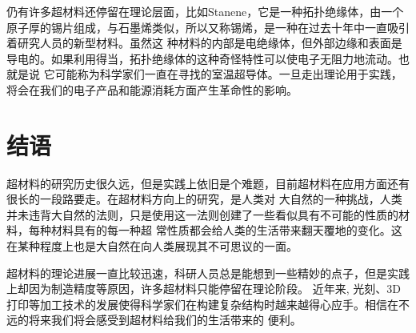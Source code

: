 \documentclass[UTF8]{ctexart}
\begin{document}
仍有许多超材料还停留在理论层面，比如Stanene，它是一种拓扑绝缘体，由一个原子厚的锡片组成，与石墨烯类似，所以又称锡烯，是一种在过去十年中一直吸引着研究人员的新型材料。虽然这
种材料的内部是电绝缘体，但外部边缘和表面是导电的。如果利用得当，拓扑绝缘体的这种奇怪特性可以使电子无阻力地流动。也就是说
它可能称为科学家们一直在寻找的室温超导体。一旦走出理论用于实践，将会在我们的电子产品和能源消耗方面产生革命性的影响。


\section{结语}
超材料的研究历史很久远，但是实践上依旧是个难题，目前超材料在应用方面还有很长的一段路要走。在超材料方向上的研究，是人类对
大自然的一种挑战，人类并未违背大自然的法则，只是使用这一法则创建了一些看似具有不可能的性质的材料，每种材料具有的每一种超
常性质都会给人类的生活带来翻天覆地的变化。这在某种程度上也是大自然在向人类展现其不可思议的一面。


超材料的理论进展一直比较迅速，科研人员总是能想到一些精妙的点子，但是实践上却因为制造精度等原因，许多超材料只能停留在理论阶段。
近年来, 光刻、3D打印等加工技术的发展使得科学家们在构建复杂结构时越来越得心应手。相信在不远的将来我们将会感受到超材料给我们的生活带来的
便利。



\end{document}
